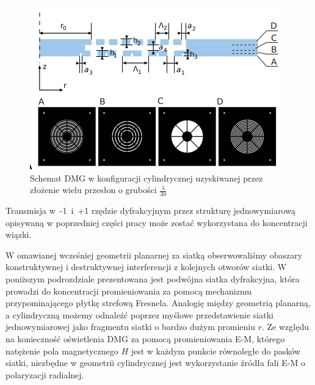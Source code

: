\begin{figure}
	\includegraphics[width=\textwidth]{images/dmg/express_siatki.png}
	\caption{Schemat DMG w konfiguracji cylindrycznej uzyskiwanej przez złożenie wielu przesłon o grubości $\frac{\lambda}{30}$ \cite{Yavorskiy:14}}
	\label{fig:schem-cyl}
\end{figure}

Transmisja w~-1~i~+1 rzędzie dyfrakcyjnym przez strukturę jednowymiarową opisywaną w poprzedniej części pracy może zostać wykorzystana do koncentracji wiązki. 

W omawianej wcześniej geometrii planarnej za siatką obserwowaliśmy obaszary konstruktywnej i destruktywnej interferencji z kolejnych otworów siatki. W poniższym podrozdziale prezentowana jest podwójna siatka dyfrakcyjna, która prowadzi do koncentracji promieniowania za pomocą mechanizmu przypominającego płytkę strefową Fresnela. Analogię między geometrią planarną, a cylindryczną możemy odnaleźć poprzez myślowe przedstawienie siatki jednowymiarowej jako fragmentu siatki o bardzo dużym promieniu $r$. Ze względu na konieczność oświetlenia DMG za pomocą promieniowania E-M, którego natężenie pola magnetycznego $H$ jest w każdym punkcie równoległe do pasków siatki, niezbędne w geometrii cylindrycznej jest wykorzystanie źródła fali E-M o polaryzacji radialnej. 


